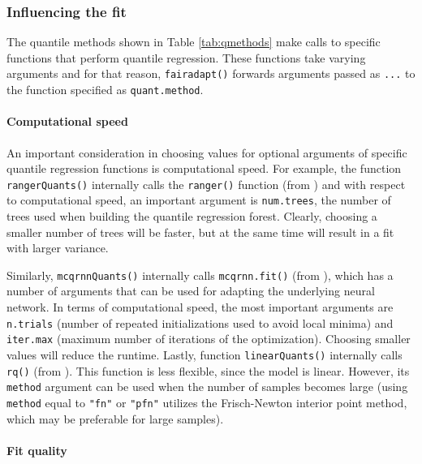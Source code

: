 \documentclass[
  nojss]{jss}
\begin{document}
\hypertarget{influencing-the-fit}{%
\subsubsection{Influencing the fit}\label{influencing-the-fit}}

The quantile methods shown in Table \ref{tab:qmethods} make calls to
specific functions that perform quantile regression. These functions
take varying arguments and for that reason, \texttt{fairadapt()}
forwards arguments passed as \texttt{...} to the function specified as
\texttt{quant.method}.

\hypertarget{computational-speed}{%
\paragraph{Computational speed}\label{computational-speed}}

An important consideration in choosing values for optional arguments of
specific quantile regression functions is computational speed. For
example, the function \texttt{rangerQuants()} internally calls the
\texttt{ranger()} function (from ) and with respect to
computational speed, an important argument is \texttt{num.trees}, the
number of trees used when building the quantile regression forest.
Clearly, choosing a smaller number of trees will be faster, but at the
same time will result in a fit with larger variance.

Similarly, \texttt{mcqrnnQuants()} internally calls
\texttt{mcqrnn.fit()} (from ), which has a number of arguments
that can be used for adapting the underlying neural network. In terms of
computational speed, the most important arguments are \texttt{n.trials}
(number of repeated initializations used to avoid local minima) and
\texttt{iter.max} (maximum number of iterations of the optimization).
Choosing smaller values will reduce the runtime. Lastly, function
\texttt{linearQuants()} internally calls \texttt{rq()} (from
). This function is less flexible, since the model is
linear. However, its \texttt{method} argument can be used when the
number of samples becomes large (using \texttt{method} equal to
\texttt{"fn"} or \texttt{"pfn"} utilizes the Frisch-Newton interior
point method, which may be preferable for large samples).

\hypertarget{fit-quality}{%
\paragraph{Fit quality}\label{fit-quality}}
\end{document}
